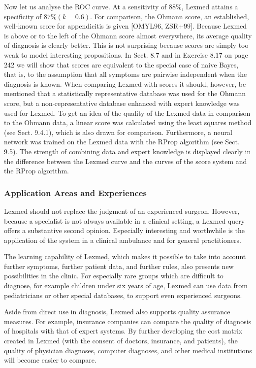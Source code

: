 \documentclass[10pt]{article}
\begin{document}
Now let us analyse the ROC curve. At a sensitivity of $88 \%$, Lexmed attains a specificity of $87 \%(k=0.6)$. For comparison, the Ohmann score, an established, well-known score for appendicitis is given [OMYL96, ZSR+99]. Because Lexmed is above or to the left of the Ohmann score almost everywhere, its average quality of diagnosis is clearly better. This is not surprising because scores are simply too weak to model interesting propositions. In Sect. 8.7 and in Exercise 8.17 on page 242 we will show that scores are equivalent to the special case of naive Bayes, that is, to the assumption that all symptoms are pairwise independent when the diagnosis is known. When comparing Lexmed with scores it should, however, be mentioned that a statistically representative database was used for the Ohmann score, but a non-representative database enhanced with expert knowledge was used for Lexmed. To get an idea of the quality of the Lexmed data in comparison to the Ohmann data, a linear score was calculated using the least squares method (see Sect. 9.4.1), which is also drawn for comparison. Furthermore, a neural network was trained on the Lexmed data with the RProp algorithm (see Sect. 9.5). The strength of combining data and expert knowledge is displayed clearly in the difference between the Lexmed curve and the curves of the score system and the RProp algorithm.

\subsubsection*{Application Areas and Experiences}
Lexmed should not replace the judgment of an experienced surgeon. However, because a specialist is not always available in a clinical setting, a Lexmed query offers a substantive second opinion. Especially interesting and worthwhile is the application of the system in a clinical ambulance and for general practitioners.

The learning capability of Lexmed, which makes it possible to take into account further symptoms, further patient data, and further rules, also presents new possibilities in the clinic. For especially rare groups which are difficult to diagnose, for example children under six years of age, Lexmed can use data from pediatricians or other special databases, to support even experienced surgeons.

Aside from direct use in diagnosis, Lexmed also supports quality assurance measures. For example, insurance companies can compare the quality of diagnosis of hospitals with that of expert systems. By further developing the cost matrix created in Lexmed (with the consent of doctors, insurance, and patients), the quality of physician diagnoses, computer diagnoses, and other medical institutions will become easier to compare.
\end{document}
